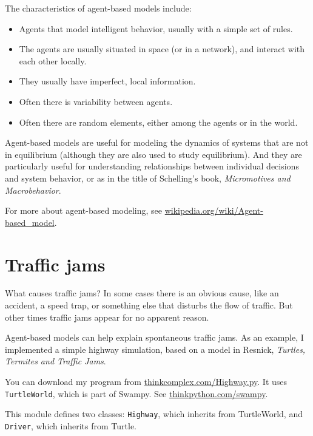 \documentclass[10pt]{book}
\begin{document}
The characteristics of agent-based models include:

\begin{itemize}

\item Agents that model intelligent behavior, usually with a simple
  set of rules.

\item The agents are usually situated in space (or in a network), and
  interact with each other locally.

\item They usually have imperfect, local information.

\item Often there is variability between agents.

\item Often there are random elements, either among the agents or in
  the world.

\end{itemize}

Agent-based models are useful for modeling the dynamics of systems
that are not in equilibrium (although they are also used to study
equilibrium).  And they are particularly useful for understanding
relationships between individual decisions and system behavior, or as
in the title of Schelling's book, {\em Micromotives and Macrobehavior}.

For more about agent-based modeling, see
\url{wikipedia.org/wiki/Agent-based_model}.


\section{Traffic jams}

What causes traffic jams?  In some cases there is an obvious cause,
like an accident, a speed trap, or something else that disturbs
the flow of traffic.  But other times traffic jams appear for no
apparent reason.

Agent-based models can help explain spontaneous traffic jams.
As an example, I implemented a simple highway simulation, based on
a model in Resnick, {\em Turtles, Termites and Traffic Jams}.

You can download my program from \url{thinkcomplex.com/Highway.py}.
It uses {\tt TurtleWorld}, which is part of Swampy.
See \url{thinkpython.com/swampy}.

This module defines two classes: {\tt Highway}, which inherits from
TurtleWorld, and {\tt Driver}, which inherits from Turtle.
\end{document}
